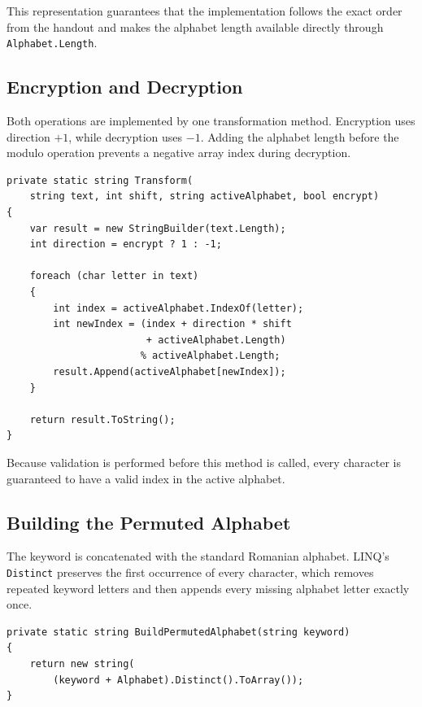\documentclass[12pt,a4paper]{article}
\begin{document}
This representation guarantees that the implementation follows the exact order from the handout and makes the alphabet length available directly through \texttt{Alphabet.Length}.

\subsection{Encryption and Decryption}

Both operations are implemented by one transformation method. Encryption uses direction $+1$, while decryption uses $-1$. Adding the alphabet length before the modulo operation prevents a negative array index during decryption.

\begin{lstlisting}[style=csharp,caption={Common transformation used for encryption and decryption}]
private static string Transform(
    string text, int shift, string activeAlphabet, bool encrypt)
{
    var result = new StringBuilder(text.Length);
    int direction = encrypt ? 1 : -1;

    foreach (char letter in text)
    {
        int index = activeAlphabet.IndexOf(letter);
        int newIndex = (index + direction * shift
                        + activeAlphabet.Length)
                       % activeAlphabet.Length;
        result.Append(activeAlphabet[newIndex]);
    }

    return result.ToString();
}
\end{lstlisting}

Because validation is performed before this method is called, every character is guaranteed to have a valid index in the active alphabet.

\subsection{Building the Permuted Alphabet}

The keyword is concatenated with the standard Romanian alphabet. LINQ's \texttt{Distinct} preserves the first occurrence of every character, which removes repeated keyword letters and then appends every missing alphabet letter exactly once.

\begin{lstlisting}[style=csharp,caption={Construction of the keyword-permuted alphabet}]
private static string BuildPermutedAlphabet(string keyword)
{
    return new string(
        (keyword + Alphabet).Distinct().ToArray());
}
\end{lstlisting}
\end{document}
